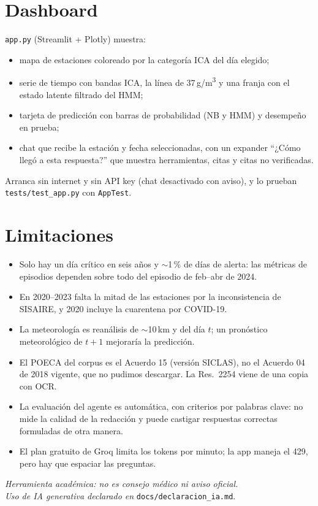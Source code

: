 \documentclass[10pt,a4paper]{article}
\newcommand{\ugm}{\,\textmu g/m\textsuperscript{3}}
\newcommand{\code}[1]{\texttt{\small #1}}
\begin{document}
\section{Dashboard}
\code{app.py} (Streamlit + Plotly) muestra:
\begin{itemize}
  \item mapa de estaciones coloreado por la categoría ICA del día elegido;
  \item serie de tiempo con bandas ICA, la línea de 37\ugm{} y una franja con el estado latente filtrado del HMM;
  \item tarjeta de predicción con barras de probabilidad (NB y HMM) y desempeño en prueba;
  \item chat que recibe la estación y fecha seleccionadas, con un expander ``¿Cómo llegó a esta
    respuesta?'' que muestra herramientas, citas y citas no verificadas.
\end{itemize}
Arranca sin internet y sin API key (chat desactivado con aviso), y lo prueban
\code{tests/test\_app.py} con \code{AppTest}.

\section{Limitaciones}
\begin{itemize}
  \item Solo hay un día crítico en seis años y $\sim$1\,\% de días de alerta: las métricas de episodios
    dependen sobre todo del episodio de feb--abr de 2024.
  \item En 2020--2023 falta la mitad de las estaciones por la inconsistencia de SISAIRE, y 2020 incluye
    la cuarentena por COVID-19.
  \item La meteorología es reanálisis de $\sim$10\,km y del día $t$; un pronóstico meteorológico de
    $t+1$ mejoraría la predicción.
  \item El POECA del corpus es el Acuerdo 15 (versión SICLAS), no el Acuerdo 04 de 2018 vigente, que no
    pudimos descargar. La Res.~2254 viene de una copia con OCR.
  \item La evaluación del agente es automática, con criterios por palabras clave: no mide la calidad de
    la redacción y puede castigar respuestas correctas formuladas de otra manera.
  \item El plan gratuito de Groq limita los tokens por minuto; la app maneja el 429, pero hay que
    espaciar las preguntas.
\end{itemize}

\vspace{4pt}
{\small\textit{Herramienta académica: no es consejo médico ni aviso oficial.}\\
\textit{Uso de IA generativa declarado en} \code{docs/declaracion\_ia.md}.}
\end{document}
